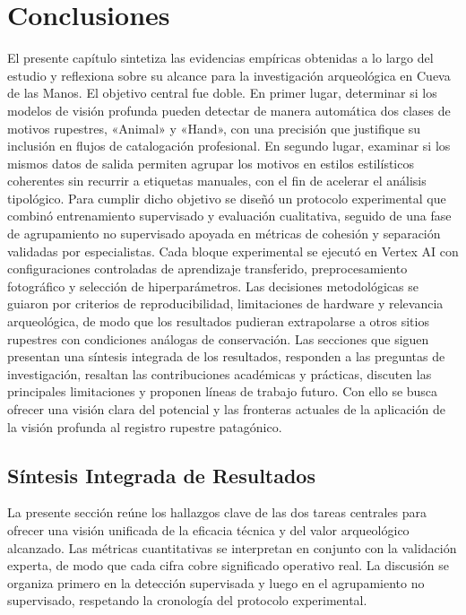 \chapter{Conclusiones}\label{ch:conclusiones}

El presente capítulo sintetiza las evidencias empíricas obtenidas a lo largo del estudio y reflexiona sobre su alcance para la investigación arqueológica en Cueva de las Manos.
El objetivo central fue doble.
En primer lugar, determinar si los modelos de visión profunda pueden detectar de manera automática dos clases de motivos rupestres, «Animal» y «Hand», con una precisión que justifique su inclusión en flujos de catalogación profesional.
En segundo lugar, examinar si los mismos datos de salida permiten agrupar los motivos en estilos estilísticos coherentes sin recurrir a etiquetas manuales, con el fin de acelerar el análisis tipológico.
Para cumplir dicho objetivo se diseñó un protocolo experimental que combinó entrenamiento supervisado y evaluación cualitativa, seguido de una fase de agrupamiento no supervisado apoyada en métricas de cohesión y separación validadas por especialistas.
Cada bloque experimental se ejecutó en Vertex AI con configuraciones controladas de aprendizaje transferido, preprocesamiento fotográfico y selección de hiperparámetros.
Las decisiones metodológicas se guiaron por criterios de reproducibilidad, limitaciones de hardware y relevancia arqueológica, de modo que los resultados pudieran extrapolarse a otros sitios rupestres con condiciones análogas de conservación.
Las secciones que siguen presentan una síntesis integrada de los resultados, responden a las preguntas de investigación, resaltan las contribuciones académicas y prácticas, discuten las principales limitaciones y proponen líneas de trabajo futuro.
Con ello se busca ofrecer una visión clara del potencial y las fronteras actuales de la aplicación de la visión profunda al registro rupestre patagónico.

\section{Síntesis Integrada de Resultados}

La presente sección reúne los hallazgos clave de las dos tareas centrales para ofrecer una visión unificada de la eficacia técnica y del valor arqueológico alcanzado.
Las métricas cuantitativas se interpretan en conjunto con la validación experta, de modo que cada cifra cobre significado operativo real.
La discusión se organiza primero en la detección supervisada y luego en el agrupamiento no supervisado, respetando la cronología del protocolo experimental.


